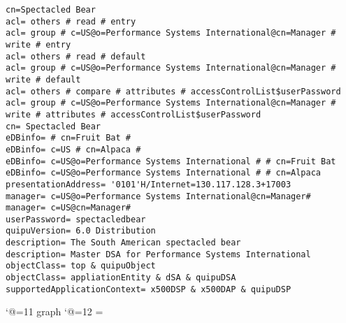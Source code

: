 
\tiny
\begin{verbatim}
cn=Spectacled Bear
acl= others # read # entry
acl= group # c=US@o=Performance Systems International@cn=Manager # write # entry
acl= others # read # default
acl= group # c=US@o=Performance Systems International@cn=Manager # write # default
acl= others # compare # attributes # accessControlList$userPassword
acl= group # c=US@o=Performance Systems International@cn=Manager # write # attributes # accessControlList$userPassword
cn= Spectacled Bear
eDBinfo= # cn=Fruit Bat # 
eDBinfo= c=US # cn=Alpaca # 
eDBinfo= c=US@o=Performance Systems International # # cn=Fruit Bat 
eDBinfo= c=US@o=Performance Systems International # # cn=Alpaca
presentationAddress= '0101'H/Internet=130.117.128.3+17003
manager= c=US@o=Performance Systems International@cn=Manager#
manager= c=US@cn=Manager#
userPassword= spectacledbear
quipuVersion= 6.0 Distribution
description= The South American spectacled bear 
description= Master DSA for Performance Systems International
objectClass= top & quipuObject
objectClass= appliationEntity & dSA & quipuDSA
supportedApplicationContext= x500DSP & x500DAP & quipuDSP

\end{verbatim}

\catcode`@=11
\expandafter\ifx\csname graph\endcsname\relax {}\box\chardef\insc@unt\graph\fi
\catcode`@=12
\setbox\graph=\empty
